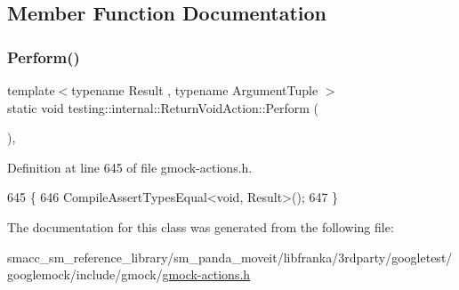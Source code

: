 \subsection{Member Function Documentation}
\mbox{\label{classtesting_1_1internal_1_1ReturnVoidAction_ab9ea50ff501225b7510a623d0f0a405e}} 
\subsubsection{\texorpdfstring{Perform()}{Perform()}}
{\footnotesize\ttfamily template$<$typename Result , typename Argument\+Tuple $>$ \\
static void testing\+::internal\+::\+Return\+Void\+Action\+::\+Perform (\begin{DoxyParamCaption}\item[{const Argument\+Tuple \&}]{ }\end{DoxyParamCaption})\hspace{0.3cm}{\ttfamily [inline]}, {\ttfamily [static]}}



Definition at line 645 of file gmock-\/actions.\+h.


\begin{DoxyCode}
645                                             \{
646     CompileAssertTypesEqual<void, Result>();
647   \}
\end{DoxyCode}


The documentation for this class was generated from the following file\+:\begin{DoxyCompactItemize}
\item 
smacc\+\_\+sm\+\_\+reference\+\_\+library/sm\+\_\+panda\+\_\+moveit/libfranka/3rdparty/googletest/googlemock/include/gmock/\hyperlink{gmock-actions_8h}{gmock-\/actions.\+h}\end{DoxyCompactItemize}

